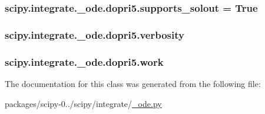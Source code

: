 \subsubsection[{supports\+\_\+solout}]{\setlength{\rightskip}{0pt plus 5cm}scipy.\+integrate.\+\_\+ode.\+dopri5.\+supports\+\_\+solout = {\bf True}\hspace{0.3cm}{\ttfamily [static]}}\label{classscipy_1_1integrate_1_1__ode_1_1dopri5_a0cbf769f7f1f20d0e5131b818bd77396}
\hypertarget{classscipy_1_1integrate_1_1__ode_1_1dopri5_ac36a3e3de8e463ec03b5c813b0a9fa44}{}
\subsubsection[{verbosity}]{\setlength{\rightskip}{0pt plus 5cm}scipy.\+integrate.\+\_\+ode.\+dopri5.\+verbosity}\label{classscipy_1_1integrate_1_1__ode_1_1dopri5_ac36a3e3de8e463ec03b5c813b0a9fa44}
\hypertarget{classscipy_1_1integrate_1_1__ode_1_1dopri5_a2854f6ec14b10a82bbc0b5b5499573c5}{}
\subsubsection[{work}]{\setlength{\rightskip}{0pt plus 5cm}scipy.\+integrate.\+\_\+ode.\+dopri5.\+work}\label{classscipy_1_1integrate_1_1__ode_1_1dopri5_a2854f6ec14b10a82bbc0b5b5499573c5}


The documentation for this class was generated from the following file\+:\begin{DoxyCompactItemize}
\item 
packages/scipy-\/0../scipy/integrate/\hyperlink{__ode_8py}{\+\_\+ode.\+py}\end{DoxyCompactItemize}
